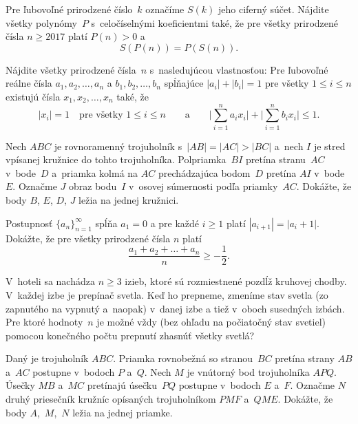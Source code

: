 {%
Pre ľubovoľné prirodzené číslo~$k$ označíme $S(k)$ jeho ciferný súčet. Nájdite všetky polynómy~$P$ s~celočíselnými koeficientmi také, že pre všetky prirodzené čísla $n\ge 2017$ platí $P(n)>0$ a $$S(P(n))=P(S(n)).$$}

{%
Nájdite všetky prirodzené čísla~$n$ s~nasledujúcou vlastnosťou: Pre ľubovoľné reálne čísla $a_1,a_2,\dots,a_n$ a $b_1,b_2,\dots,b_n$ spĺňajúce $|a_i|+|b_i|=1$ pre všetky $1\le i\le n$ existujú čísla $x_1,x_2,\dots,x_n$ také, že
$$|x_i|=1\quad\text{pre všetky $1\le i\le n$} \qquad\text{a}\qquad
\Big |\sum_{i=1}^na_ix_i\Big |+\Big |\sum_{i=1}^nb_ix_i\Big |\le 1.$$
}

{%
Nech $ABC$ je rovnoramenný trojuholník s~$|AB|=|AC|>|BC|$ a~nech $I$ je stred vpísanej kružnice do tohto trojuholníka. Polpriamka~$BI$ pretína stranu~$AC$ v~bode~$D$ a~priamka kolmá na $AC$ prechádzajúca bodom~$D$ pretína $AI$ v~bode~$E$. Označme $J$ obraz bodu~$I$ v~osovej súmernosti podľa priamky~$AC$. Dokážte, že body $B$, $E$, $D$, $J$ ležia na jednej kružnici.}

{%
Postupnosť $\{a_n\}_{n=1}^\infty$ spĺňa $a_1 = 0$ a pre každé $i\ge1$ platí $|a_{i+1}| = |a_i + 1|$. Dokážte, že pre všetky prirodzené čísla $n$ platí
$$
\frac{a_1+a_2+\dots+a_n}{n} \ge -\frac12.
$$
}

{%
V~hoteli sa nachádza $n\ge3$ izieb, ktoré sú rozmiestnené pozdĺž kruhovej chodby. V~každej izbe je prepínač svetla. Keď ho prepneme, zmeníme stav svetla (zo zapnutého na vypnutý a~naopak) v~danej izbe a tiež v~oboch susedných izbách. Pre ktoré hodnoty~$n$ je možné vždy (bez ohľadu na počiatočný stav svetiel) pomocou konečného počtu prepnutí zhasnúť všetky svetlá?
}

{%
Daný je trojuholník $ABC$. Priamka rovnobežná so stranou~$BC$ pretína strany $AB$ a~$AC$ postupne v~bodoch $P$ a~$Q$. Nech $M$ je vnútorný bod trojuholníka $APQ$. Úsečky $MB$ a~$MC$ pretínajú úsečku~$PQ$ postupne v~bodoch $E$ a~$F$. Označme $N$ druhý priesečník kružníc opísaných trojuholníkom $PMF$ a~$QME$. Dokážte, že body $A$,~$M$,~$N$ ležia na jednej priamke.}

